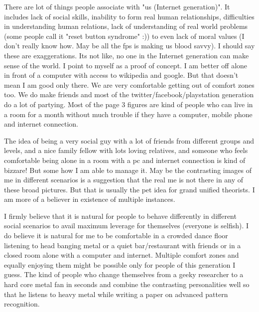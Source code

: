 There are lot of things people associate with "us (Internet generation)". It includes lack of social skills, inability to form real human relationships, difficulties in understanding human relations, lack of understanding of real world problems (some people call it "reset button syndrome" :)) to even lack of moral values (I don't really know how. May be all the fps is making us blood savvy). I should say these are exaggerations. Its not like, no one in the Internet generation can make sense of the world. I point to myself as a proof of concept. I am better off alone in front of a computer with access to wikipedia and google. But that doesn't mean I am good only there. We are very comfortable getting out of comfort zones too. We do make friends and most of the twitter/facebook/playstation generation do a lot of partying. Most of the page 3 figures are kind of people who can live in a room for a month without much trouble if they have a computer, mobile phone and internet connection. 

The idea of being a very social guy with a lot of friends from different groups and levels, and a nice family fellow with lots loving relatives, and someone who feels comfortable being alone in a room with a pc and internet connection is kind of bizzare! But some how I am able to manage it. May be the contrasting images of me in different scenarios is a suggestion that the real me is not there in any of these broad pictures. But that is usually the pet idea for grand unified theorists. I am more of a believer in existence of multiple instances. 

I firmly believe that it is natural for people to behave differently in different social scenarios to avail maximum leverage for themselves (everyone is selfish). I do believe it is natural for me to be comfortable in a crowded dance floor listening to head banging metal or a quiet bar/restaurant with friends or in a closed room alone with a computer and internet. Multiple comfort zones and equally enjoying them might be possible only for people of this generation I guess. The kind of people who change themselves from a geeky researcher to a hard core metal fan in seconds and combine the contrasting personalities well so that he listens to heavy metal while writing a paper on advanced pattern recognition. 

